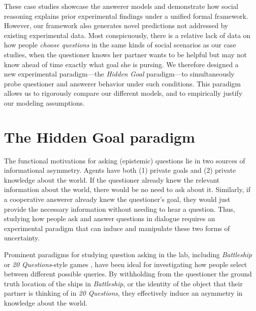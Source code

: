 \documentclass[11pt, floatsintext]{apa6}
\begin{document}

These case studies showcase the answerer models and demonstrate how social reasoning explains prior experimental findings under a unified formal framework. 
However, our framework also generates novel predictions not addressed by existing experimental data.
Most conspicuously, there is a relative lack of data on how people \emph{choose questions} in the same kinds of social scenarios as our case studies, when the questioner knows her partner wants to be helpful but may not know ahead of time exactly what goal she is pursing.
We therefore designed a new experimental paradigm---the \emph{Hidden Goal} paradigm---to simultaneously probe questioner and answerer behavior under such conditions.
This paradigm allows us to rigorously compare our different models, and to empirically justify our modeling assumptions.

\section{The Hidden Goal paradigm}

The functional motivations for asking (epistemic) questions lie in two sources of informational asymmetry. 
Agents have both (1) private goals and (2) private knowledge about the world. 
If the questioner already knew the relevant information about the world, there would be no need to ask about it.
Similarly, if a cooperative answerer already knew the questioner's goal, they would just provide the necessary information without needing to hear a question.
Thus, studying how people ask and answer questions in dialogue requires an experimental paradigm that can induce and manipulate these two forms of uncertainty.

Prominent paradigms for studying question asking in the lab, including \emph{Battleship} \cite{RotheEtAl16_NaturalLanguageQuestions, rothe2018people} or \emph{20 Questions}-style games \cite{Siegler77_TwentyQuestions, cohen2016searching, NelsonDivjak___Meder14_GuessWho, RuggeriEtAl15_HierarchicalTwentyQs}, have been ideal for investigating how people select between different possible queries.
By withholding from the questioner the ground truth location of the ships in \emph{Battleship}, or the identity of the object that their partner is thinking of in \emph{20 Questions}, they effectively induce an asymmetry in knowledge about the world.
\end{document}
